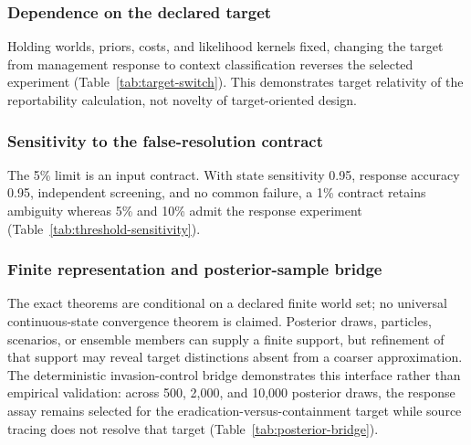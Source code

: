 \subsubsection{Dependence on the declared target}
Holding worlds, priors, costs, and likelihood kernels fixed, changing the target from management response to context classification reverses the selected experiment (Table~\ref{tab:target-switch}). This demonstrates target relativity of the reportability calculation, not novelty of target-oriented design.

\begin{table}[ht]
\centering
\small

\caption{Probability that each experiment produces a contract-valid deterministic report under two declared targets. The same evidence model yields opposite target-safe choices.}
\label{tab:target-switch}
\end{table}

\subsubsection{Sensitivity to the false-resolution contract}
The 5\% limit is an input contract. With state sensitivity 0.95, response accuracy 0.95, independent screening, and no common failure, a 1\% contract retains ambiguity whereas 5\% and 10\% admit the response experiment (Table~\ref{tab:threshold-sensitivity}).

\begin{table}[ht]
\centering
\small

\caption{Target-safe terminal reports under alternative false-resolution limits. Wrong deterministic reporting remains below the declared limit, while ambiguity and cost respond to the contract.}
\label{tab:threshold-sensitivity}
\end{table}

\subsubsection{Finite representation and posterior-sample bridge}
The exact theorems are conditional on a declared finite world set; no universal continuous-state convergence theorem is claimed. Posterior draws, particles, scenarios, or ensemble members can supply a finite support, but refinement of that support may reveal target distinctions absent from a coarser approximation. The deterministic invasion-control bridge demonstrates this interface rather than empirical validation: across 500, 2,000, and 10,000 posterior draws, the response assay remains selected for the eradication-versus-containment target while source tracing does not resolve that target (Table~\ref{tab:posterior-bridge}).

